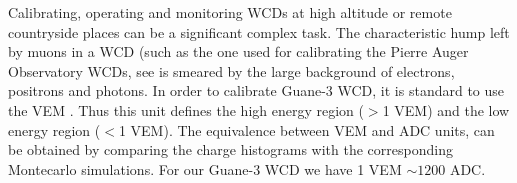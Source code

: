Calibrating, operating and monitoring WCDs at high altitude or remote
countryside places can be a significant complex task. The characteristic hump
left by muons in a WCD (such as the one used for calibrating the Pierre Auger
Observatory WCDs, see \cite{Bertou2006} is smeared by the large background
of electrons, positrons and photons. In order to calibrate Guane-3 WCD, it is
standard to use the VEM \cite{Etchegoyen2005}. Thus this unit defines the
high energy region ($>$1 VEM) and the low energy region ($<$1 VEM). The
equivalence between VEM and ADC units, can be obtained by comparing the charge
histograms with the corresponding Montecarlo simulations. For our Guane-3 WCD
we have 1 VEM $\sim 1200$ ADC. 



